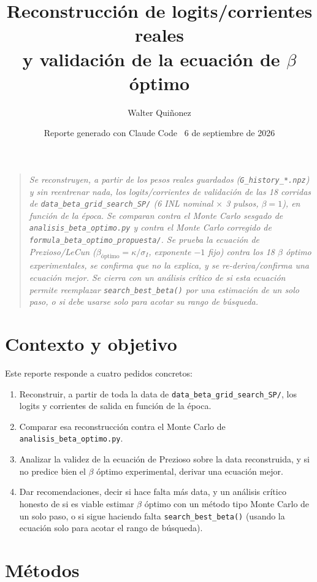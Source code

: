 \documentclass[11pt]{article}
\title{\textbf{Reconstrucción de logits/corrientes reales\\
y validación de la ecuación de $\beta$ óptimo}}
\author{Walter Quiñonez}
\date{Reporte generado con Claude Code \textperiodcentered\ 6 de septiembre de 2026}
\begin{document}
\maketitle

\begin{quote}\itshape
Se reconstruyen, a partir de los pesos reales guardados
(\texttt{G\_history\_*.npz}) y sin reentrenar nada, los logits/corrientes de
validación de las 18 corridas de \texttt{data\_beta\_grid\_search\_SP/}
(6 INL nominal $\times$ 3 pulsos, $\beta=1$), en función de la época. Se
comparan contra el Monte Carlo sesgado de \texttt{analisis\_beta\_optimo.py}
y contra el Monte Carlo corregido de \texttt{formula\_beta\_optimo\_propuesta/}.
Se prueba la ecuación de Prezioso/LeCun ($\beta_{\text{óptimo}}=\kappa/\sigma_I$,
exponente $-1$ fijo) contra los 18 $\beta$ óptimo experimentales, se
confirma que no la explica, y se re-deriva/confirma una ecuación mejor. Se
cierra con un análisis crítico de si esta ecuación permite reemplazar
\texttt{search\_best\_beta()} por una estimación de un solo paso, o si debe
usarse solo para acotar su rango de búsqueda.
\end{quote}

\tableofcontents

\section{Contexto y objetivo}

Este reporte responde a cuatro pedidos concretos:
\begin{enumerate}
\item Reconstruir, a partir de toda la data de \texttt{data\_beta\_grid\_search\_SP/},
  los logits y corrientes de salida en función de la época.
\item Comparar esa reconstrucción contra el Monte Carlo de
  \texttt{analisis\_beta\_optimo.py}.
\item Analizar la validez de la ecuación de Prezioso sobre la data
  reconstruida, y si no predice bien el $\beta$ óptimo experimental,
  derivar una ecuación mejor.
\item Dar recomendaciones, decir si hace falta más data, y un análisis
  crítico honesto de si es viable estimar $\beta$ óptimo con un método
  tipo Monte Carlo de un solo paso, o si sigue haciendo falta
  \texttt{search\_best\_beta()} (usando la ecuación solo para acotar el
  rango de búsqueda).
\end{enumerate}

\section{Métodos}
\end{document}
